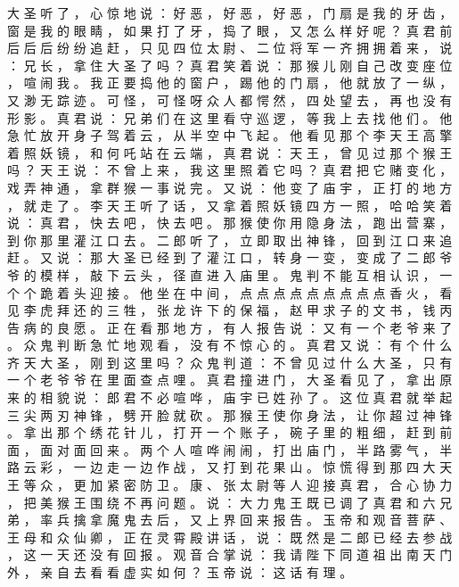 {大 圣 听 了 ， 心 惊 地 说 ： 好 恶 ， 好 恶 ， 好 恶 ， 门 扇 是 我 的 牙 齿 ， 窗 是 我 的 眼 睛 ， 如 果 打 了 牙 ， 捣 了 眼 ， 又 怎 么 样 好 呢 ？
真 君 前 后 后 后 纷 纷 追 赶 ， 只 见 四 位 太 尉 、 二 位 将 军 一 齐 拥 拥 着 来 ， 说 ： 兄 长 ， 拿 住 大 圣 了 吗 ？ 真 君 笑 着 说 ： 那 猴 儿 刚 自 己 改 变 座 位 ， 喧 闹 我 。
我 正 要 捣 他 的 窗 户 ， 踢 他 的 门 扇 ， 他 就 放 了 一 纵 ， 又 渺 无 踪 迹 。
可 怪 ， 可 怪 呀 众 人 都 愕 然 ， 四 处 望 去 ， 再 也 没 有 形 影 。
真 君 说 ： 兄 弟 们 在 这 里 看 守 巡 逻 ， 等 我 上 去 找 他 们 。
他 急 忙 放 开 身 子 驾 着 云 ， 从 半 空 中 飞 起 。
他 看 见 那 个 李 天 王 高 擎 着 照 妖 镜 ， 和 何 吒 站 在 云 端 ， 真 君 说 ： 天 王 ， 曾 见 过 那 个 猴 王 吗 ？ 天 王 说 ： 不 曾 上 来 ， 我 这 里 照 着 它 吗 ？
真 君 把 它 赌 变 化 ， 戏 弄 神 通 ， 拿 群 猴 一 事 说 完 。
又 说 ： 他 变 了 庙 宇 ， 正 打 的 地 方 ， 就 走 了 。
李 天 王 听 了 话 ， 又 拿 着 照 妖 镜 四 方 一 照 ， 哈 哈 笑 着 说 ： 真 君 ， 快 去 吧 ， 快 去 吧 。
那 猴 使 你 用 隐 身 法 ， 跑 出 营 寨 ， 到 你 那 里 灌 江 口 去 。
二 郎 听 了 ， 立 即 取 出 神 锋 ， 回 到 江 口 来 追 赶 。
又 说 ： 那 大 圣 已 经 到 了 灌 江 口 ， 转 身 一 变 ， 变 成 了 二 郎 爷 爷 的 模 样 ， 敲 下 云 头 ， 径 直 进 入 庙 里 。
鬼 判 不 能 互 相 认 识 ， 一 个 个 跪 着 头 迎 接 。
他 坐 在 中 间 ， 点 点 点 点 点 点 点 点 点 香 火 ， 看 见 李 虎 拜 还 的 三 牲 ， 张 龙 许 下 的 保 福 ， 赵 甲 求 子 的 文 书 ， 钱 丙 告 病 的 良 愿 。
正 在 看 那 地 方 ， 有 人 报 告 说 ： 又 有 一 个 老 爷 来 了 。
众 鬼 判 断 急 忙 地 观 看 ， 没 有 不 惊 心 的 。
真 君 又 说 ： 有 个 什 么 齐 天 大 圣 ， 刚 到 这 里 吗 ？ 众 鬼 判 道 ： 不 曾 见 过 什 么 大 圣 ， 只 有 一 个 老 爷 爷 在 里 面 查 点 哩 。
真 君 撞 进 门 ， 大 圣 看 见 了 ， 拿 出 原 来 的 相 貌 说 ： 郎 君 不 必 喧 哗 ， 庙 宇 已 姓 孙 了 。
这 位 真 君 就 举 起 三 尖 两 刃 神 锋 ， 劈 开 脸 就 砍 。
那 猴 王 使 你 身 法 ， 让 你 超 过 神 锋 。
拿 出 那 个 绣 花 针 儿 ， 打 开 一 个 账 子 ， 碗 子 里 的 粗 细 ， 赶 到 前 面 ， 面 对 面 回 来 。
两 个 人 喧 哗 闹 闹 ， 打 出 庙 门 ， 半 路 雾 气 ， 半 路 云 彩 ， 一 边 走 一 边 作 战 ， 又 打 到 花 果 山 。
惊 慌 得 到 那 四 大 天 王 等 众 ， 更 加 紧 密 防 卫 。
康 、 张 太 尉 等 人 迎 接 真 君 ， 合 心 协 力 ， 把 美 猴 王 围 绕 不 再 问 题 。
说 ： 大 力 鬼 王 既 已 调 了 真 君 和 六 兄 弟 ， 率 兵 擒 拿 魔 鬼 去 后 ， 又 上 界 回 来 报 告 。
玉 帝 和 观 音 菩 萨 、 王 母 和 众 仙 卿 ， 正 在 灵 霄 殿 讲 话 ， 说 ： 既 然 是 二 郎 已 经 去 参 战 ， 这 一 天 还 没 有 回 报 。
观 音 合 掌 说 ： 我 请 陛 下 同 道 祖 出 南 天 门 外 ， 亲 自 去 看 看 虚 实 如 何 ？ 玉 帝 说 ： 这 话 有 理 。
}
